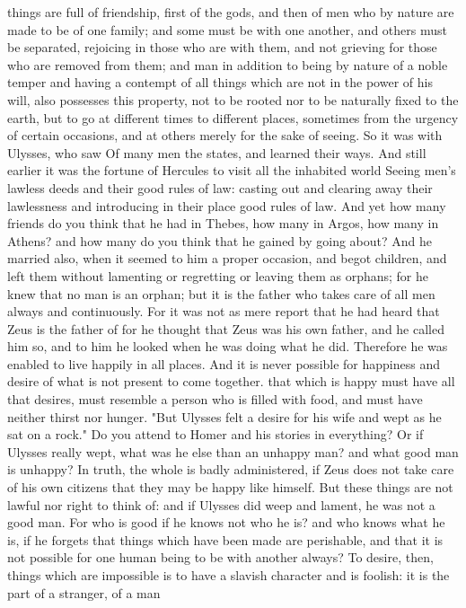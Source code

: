 \documentclass[a4paper]{article}
\begin{document}
things are full of friendship, first of the gods, and then of men who by nature
are made to be of one family; and some must be with one another, and others
must be separated, rejoicing in those who are with them, and not grieving for
those who are removed from them; and man in addition to being by nature of a
noble temper and having a contempt of all things which are not in the power of
his will, also possesses this property, not to be rooted nor to be naturally
fixed to the earth, but to go at different times to different places, sometimes
from the urgency of certain occasions, and at others merely for the sake of
seeing. So it was with Ulysses, who saw
       Of many men the states, and learned their ways.
And still earlier it was the fortune of Hercules to visit all the inhabited
world
       Seeing men's lawless deeds and their good rules of law:
casting out and clearing away their lawlessness and introducing in their place
good rules of law. And yet how many friends do you think that he had in Thebes,
how many in Argos, how many in Athens? and how many do you think that he gained
by going about? And he married also, when it seemed to him a proper occasion,
and begot children, and left them without lamenting or regretting or leaving
them as orphans; for he knew that no man is an orphan; but it is the father who
takes care of all men always and continuously. For it was not as mere report
that he had heard that Zeus is the father of for he thought that Zeus was his
own father, and he called him so, and to him he looked when he was doing what
he did. Therefore he was enabled to live happily in all places. And it is never
possible for happiness and desire of what is not present to come together. that
which is happy must have all that desires, must resemble a person who is filled
with food, and must have neither thirst nor hunger. "But Ulysses felt a desire
for his wife and wept as he sat on a rock." Do you attend to Homer and his
stories in everything? Or if Ulysses really wept, what was he else than an
unhappy man? and what good man is unhappy? In truth, the whole is badly
administered, if Zeus does not take care of his own citizens that they may be
happy like himself. But these things are not lawful nor right to think of: and
if Ulysses did weep and lament, he was not a good man. For who is good if he
knows not who he is? and who knows what he is, if he forgets that things which
have been made are perishable, and that it is not possible for one human being
to be with another always? To desire, then, things which are impossible is to
have a slavish character and is foolish: it is the part of a stranger, of a man
\end{document}
